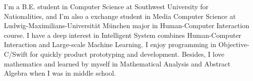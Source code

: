 
\begin{cventries}
  \cventry
    {}
    {}
    {}
    {}
    {
    I'm a B.E. student in Computer Science at Southwest University for Nationalities, and I'm also a exchange student in Media Computer Science at Ludwig-Maximilians-Universität München major in Human-Computer Interaction course.
    I have a deep interest in Intelligent System combines Human-Computer Interaction and Large-scale Machine Learning. I enjoy programming in Objective-C/Swift for quickly product prototyping and development. Besides, I love mathematics and learned by myself in Mathematical Analysis and Abstract Algebra when I was in middle school.
    }
\end{cventries}
